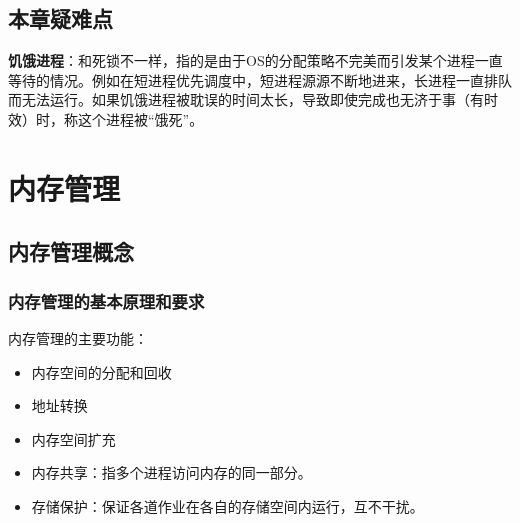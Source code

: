 \documentclass[12pt, a4paper, oneside]{ctexart}
\begin{document}
\subsection{本章疑难点}

\textbf{饥饿进程}：和死锁不一样，指的是由于OS的分配策略不完美而引发某个进程一直等待的情况。例如在短进程优先调度中，短进程源源不断地进来，长进程一直排队而无法运行。如果饥饿进程被耽误的时间太长，导致即使完成也无济于事（有时效）时，称这个进程被“饿死”。

\section{内存管理}

\subsection{内存管理概念}

\subsubsection{内存管理的基本原理和要求}

内存管理的主要功能：
\begin{itemize}
  \item 内存空间的分配和回收
  \item 地址转换
  \item 内存空间扩充
  \item 内存共享：指多个进程访问内存的同一部分。
  \item 存储保护：保证各道作业在各自的存储空间内运行，互不干扰。
\end{itemize}
\end{document}

